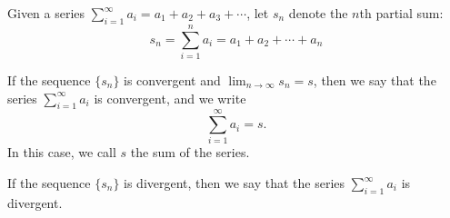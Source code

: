 \begin{frame}
\begin{definition}
Given a series $\sum_{i=1}^\infty a_i = a_1 + a_2 + a_3 + \cdots$, let $s_n$ denote the $n$th partial sum:
\[
s_n = \sum_{i=1}^n a_i = a_1 + a_2 + \cdots + a_n
\]

If the sequence $\{ s_n\}$ is convergent and $\lim_{n\to \infty} s_n = s$, then we say that the series $\sum_{i=1}^\infty a_i$ is convergent, and we write
\[
\sum_{i=1}^\infty a_i = s.
\]
In this case, we call $s$ the sum of the series.

If the sequence $\{ s_n\}$ is divergent, then we say that the series $\sum_{i=1}^\infty a_i$ is divergent.
\end{definition}
\end{frame}
